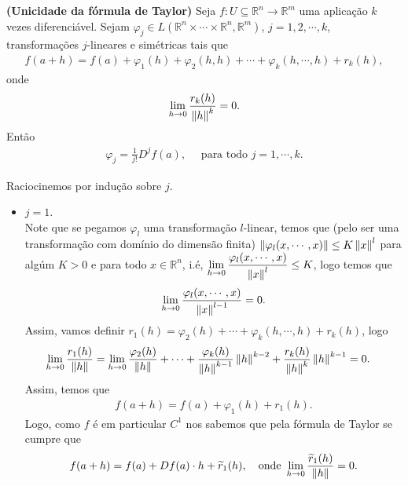 \begin{homeworkProblem}[Seção 3-8]
  \textbf{(Unicidade da fórmula de Taylor)} Seja $f:U\subseteq\mathbb{R}^{n}\to\mathbb{R}^{m}$ uma aplicação $k$ vezes diferenciável. Sejam $\varphi_{j}\in L\left( \mathbb{R}^{n}\times\cdots\times\mathbb{R}^{n},\mathbb{R}^{m} \right)$, $j=1,2,\cdots,k$, transformações $j$-lineares e simétricas tais que
  \begin{align*}
    f(a+h)=f(a)+\varphi_{1}(h)+\varphi_2(h,h)+\cdots+\varphi_{k}(h,\cdots,h)+r_{k}(h),
  \end{align*}
  onde
  \begin{align*}
    \lim_{h \to 0}\frac{r_{k}(h)}{\left\|h\right\|^{k}}=0.
  \end{align*}
  Então
  \begin{align*}
    \varphi_{j}=\frac{1}{j!}D^{j}f(a),\quad\text{ para todo }j=1,\cdots,k.
  \end{align*}
  \begin{solution}
    Raciocinemos por indução sobre $j$.
    \begin{itemize}
      \item $j=1$.\\
        Note que se pegamos $\varphi_{l}$ uma transformação $l$-linear, temos que (pelo ser uma transformação com domínio do dimensão finita) $\left\|\varphi_{l}(x,\cdots,x)\right\|\leq K\left\|x\right\|^{l}$ para algúm $K>0$ e para todo $x\in\mathbb{R}^{n}$, i.é, $\displaystyle \lim_{h \to 0}\frac{\varphi_{l}(x,\cdots,x)}{\left\|x\right\|^{l}}\leq K$, logo temos que
        \begin{align*}
          \lim_{h \to 0}\frac{\varphi_{l}(x,\cdots,x)}{\left\|x\right\|^{l-1}}=0.
        \end{align*}
        Assim, vamos definir $r_{1}(h)=\varphi_2(h)+\cdots+\varphi_{k}(h,\cdots,h)+r_{k}(h)$, logo
        \begin{align*}
          \lim_{h \to 0}\frac{r_{1}(h)}{\left\|h\right\|}&=\lim_{h \to 0}\frac{\varphi_2(h)}{\left\|h\right\|}+\cdots+\frac{\varphi_{k}(h)}{\left\|h\right\|^{k-1}}\left\|h\right\|^{k-2}+\frac{r_k(h)}{\left\|h\right\|^{k}}\left\|h\right\|^{k-1}=0.
        \end{align*}
        Assim, temos que
        \begin{align*}
          f(a+h)=f(a)+\varphi_1(h)+r_{1}(h).
        \end{align*}
        Logo, como $f$ é em particular $C^{1}$ nos sabemos que pela fórmula de Taylor se cumpre que
        \begin{align*}
          f(a+h)=f(a)+Df(a)\cdot h+\tilde{r}_{1}(h),\quad\text{onde }\lim_{h \to 0}\frac{\tilde{r}_1(h)}{\norm{h}}=0.

\end{align*}
\end{itemize}
\end{solution}
\end{homeworkProblem}
